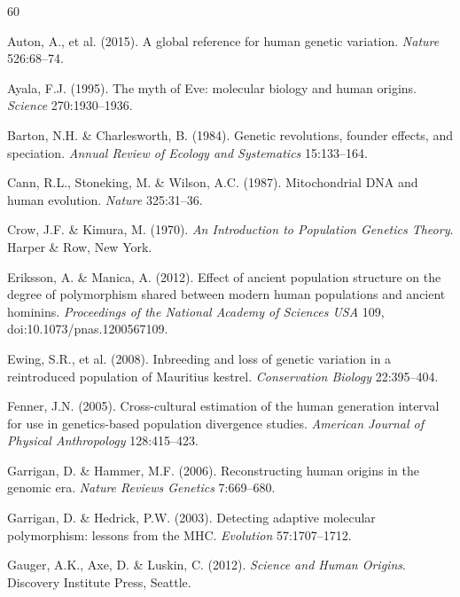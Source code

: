 \begin{thebibliography}{60}
\setlength{\itemsep}{1pt}

Auton, A., et al. (2015). A global reference for human genetic variation.
\emph{Nature} 526:68--74.

Ayala, F.J. (1995). The myth of Eve: molecular biology and human origins.
\emph{Science} 270:1930--1936.

Barton, N.H. \& Charlesworth, B. (1984). Genetic revolutions, founder
effects, and speciation. \emph{Annual Review of Ecology and Systematics}
15:133--164.

Cann, R.L., Stoneking, M. \& Wilson, A.C. (1987). Mitochondrial DNA and
human evolution. \emph{Nature} 325:31--36.

Crow, J.F. \& Kimura, M. (1970). \emph{An Introduction to Population
Genetics Theory}. Harper \& Row, New York.

Eriksson, A. \& Manica, A. (2012). Effect of ancient population structure
on the degree of polymorphism shared between modern human populations and
ancient hominins. \emph{Proceedings of the National Academy of Sciences
USA} 109, doi:10.1073/pnas.1200567109.

Ewing, S.R., et al. (2008). Inbreeding and loss of genetic variation in a
reintroduced population of Mauritius kestrel. \emph{Conservation Biology}
22:395--404.

Fenner, J.N. (2005). Cross-cultural estimation of the human generation
interval for use in genetics-based population divergence studies.
\emph{American Journal of Physical Anthropology} 128:415--423.

Garrigan, D. \& Hammer, M.F. (2006). Reconstructing human origins in the
genomic era. \emph{Nature Reviews Genetics} 7:669--680.

Garrigan, D. \& Hedrick, P.W. (2003). Detecting adaptive molecular
polymorphism: lessons from the MHC. \emph{Evolution} 57:1707--1712.

Gauger, A.K., Axe, D. \& Luskin, C. (2012). \emph{Science and Human Origins}.
Discovery Institute Press, Seattle.


\end{thebibliography}

